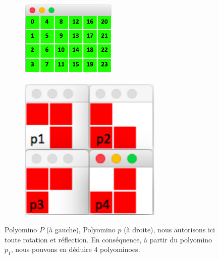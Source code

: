 \documentclass[a4paper,12pt]{article}
\begin{document}
\begin{figure}
	\centering
	\begin{subfigure}[h]{0.4\textwidth}
		\centering
		\includegraphics[width=\textwidth]{figures/P5.png}
	\end{subfigure}
	\hspace{0.1\textwidth}
	\begin{subfigure}[h]{0.4\textwidth}
		\centering
		\includegraphics[width=0.75\textwidth]{figures/4p.png}
	\end{subfigure}
	\caption{\label{fig:polyominoes}Polyomino $P$ (à gauche), Polyomino $p$ (à droite), nous autorisons ici toute rotation et réflection. En conséquence, à partir du polyomino $p_1$, nous pouvons en déduire 4 polyominoes. }
\end{figure}
\end{document}
